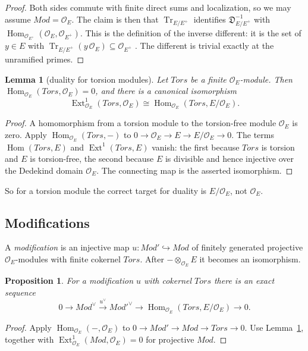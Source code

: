\documentclass[11pt]{amsart}
\newtheorem{proposition}[theorem]{Proposition}
\newtheorem{lemma}[theorem]{Lemma}
\theoremstyle{definition}
\theoremstyle{remark}
\newcommand{\OEring}{\mathcal{O}_E}
\newcommand{\OEp}{\mathcal{O}_{E^+}}
\newcommand{\Md}{\mathit{Mod}}
\newcommand{\Tors}{\mathit{Tors}}
\DeclareMathOperator{\Hom}{Hom}
\DeclareMathOperator{\Ext}{Ext}
\DeclareMathOperator{\Tr}{Tr}
\newcommand{\Diff}{\mathfrak{D}_{E/E^+}}
\newcommand{\dual}{^{\vee}}
\begin{document}
\begin{proof}
Both sides commute with finite direct sums and localization, so we may assume $\Md=\OEring$. The claim is then that $\Tr_{E/E^+}$ identifies $\Diff^{-1}$ with $\Hom_{\OEp}(\OEring,\OEp)$. This is the definition of the inverse different: it is the set of $y\in E$ with $\Tr_{E/E^+}(y\,\OEring)\subseteq\OEp$ \cite[Ch.~III, \S2]{Neukirch}. The different is trivial exactly at the unramified primes.
\end{proof}

\begin{lemma}[duality for torsion modules]\label{lem:torsion-dual}
Let $\Tors$ be a finite $\OEring$-module. Then $\Hom_{\OEring}(\Tors,\OEring)=0$, and there is a canonical isomorphism
\[
\Ext^1_{\OEring}(\Tors,\OEring)\cong\Hom_{\OEring}(\Tors,E/\OEring).
\]
\end{lemma}

\begin{proof}
A homomorphism from a torsion module to the torsion-free module $\OEring$ is zero. Apply $\Hom_{\OEring}(\Tors,-)$ to $0\to\OEring\to E\to E/\OEring\to 0$. The terms $\Hom(\Tors,E)$ and $\Ext^1(\Tors,E)$ vanish: the first because $\Tors$ is torsion and $E$ is torsion-free, the second because $E$ is divisible and hence injective over the Dedekind domain $\OEring$. The connecting map is the asserted isomorphism.
\end{proof}

So for a torsion module the correct target for duality is $E/\OEring$, not $\OEring$.

\subsection{Modifications}
A \emph{modification} is an injective map $u\colon\Md'\hookrightarrow\Md$ of finitely generated projective $\OEring$-modules with finite cokernel $\Tors$. After $-\otimes_{\OEring}E$ it becomes an isomorphism.

\begin{proposition}\label{prop:modification-dual}
For a modification $u$ with cokernel $\Tors$ there is an exact sequence
\[
0\to\Md\dual\xrightarrow{u\dual}\Md'^{\vee}\to\Hom_{\OEring}(\Tors,E/\OEring)\to 0 .
\]
\end{proposition}

\begin{proof}
Apply $\Hom_{\OEring}(-,\OEring)$ to $0\to\Md'\to\Md\to\Tors\to0$. Use Lemma~\ref{lem:torsion-dual}, together with $\Ext^1_{\OEring}(\Md,\OEring)=0$ for projective $\Md$.
\end{proof}
\end{document}
